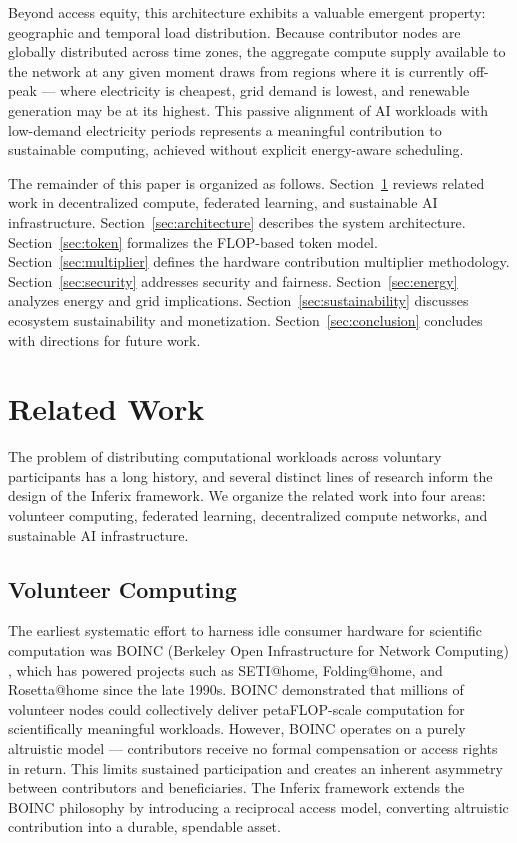 \documentclass[12pt]{article}
\begin{document}
Beyond access equity, this architecture exhibits a valuable emergent property: geographic and temporal load distribution. Because contributor nodes are globally distributed across time zones, the aggregate compute supply available to the network at any given moment draws from regions where it is currently off-peak — where electricity is cheapest, grid demand is lowest, and renewable generation may be at its highest. This passive alignment of AI workloads with low-demand electricity periods represents a meaningful contribution to sustainable computing, achieved without explicit energy-aware scheduling.

The remainder of this paper is organized as follows. Section~\ref{sec:related} reviews related work in decentralized compute, federated learning, and sustainable AI infrastructure. Section~\ref{sec:architecture} describes the system architecture. Section~\ref{sec:token} formalizes the FLOP-based token model. Section~\ref{sec:multiplier} defines the hardware contribution multiplier methodology. Section~\ref{sec:security} addresses security and fairness. Section~\ref{sec:energy} analyzes energy and grid implications. Section~\ref{sec:sustainability} discusses ecosystem sustainability and monetization. Section~\ref{sec:conclusion} concludes with directions for future work.

\section{Related Work}
\label{sec:related}

The problem of distributing computational workloads across voluntary participants has a long history, and several distinct lines of research inform the design of the Inferix framework. We organize the related work into four areas: volunteer computing, federated learning, decentralized compute networks, and sustainable AI infrastructure.

\subsection{Volunteer Computing}

The earliest systematic effort to harness idle consumer hardware for scientific computation was BOINC (Berkeley Open Infrastructure for Network Computing) \cite{anderson2004boinc}, which has powered projects such as SETI@home, Folding@home, and Rosetta@home since the late 1990s. BOINC demonstrated that millions of volunteer nodes could collectively deliver petaFLOP-scale computation for scientifically meaningful workloads. However, BOINC operates on a purely altruistic model — contributors receive no formal compensation or access rights in return. This limits sustained participation and creates an inherent asymmetry between contributors and beneficiaries. The Inferix framework extends the BOINC philosophy by introducing a reciprocal access model, converting altruistic contribution into a durable, spendable asset.
\end{document}
